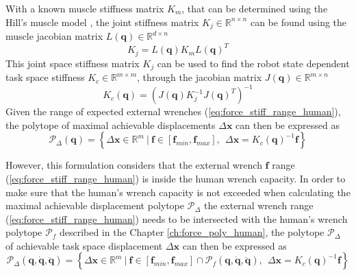 With a known muscle stiffness matrix $K_m$, that can be determined using the Hill's muscle model \cite{LATASH1993653}, the joint stiffness matrix $K_j\in \mathbb{R}^{n\times n}$ can be found using the muscle jacobian matrix $L(\bm{q}) \in \mathbb{R}^{d\times n}$
\begin{equation}
    K_j = L(\bm{q}) K_m L(\bm{q})^T 
\end{equation}
This joint space stiffness matrix $K_j$ can be used to find the robot state dependent task space stiffness $K_c  \in \mathbb{R}^{m\times m}$, through the jacobian matrix $J(\bm{q})\in\mathbb{R}^{m\times n}$  \cite{Salisbury1980,Ajoudani2018,Inouye2016}
\begin{equation}
     K_c(\bm{q}) = (J(\bm{q}) K_j^{-1}J(\bm{q})^T)^{-1}
\end{equation}
Given the range of expected external wrenches (\ref{eq:force_stiff_range_human}), the polytope of maximal achievable displacements $\Delta\bm{x}$ can then be expressed as
\begin{equation}
    \mathcal{P}_\Delta(\bm{q}) = \left\{ \Delta\bm{x} \in \mathbb{R}^m ~|~ \bm{f}\in\left[\bm{f}_{min}, \bm{f}_{max} \right], ~~ \Delta\bm{x} = K_c(\bm{q})^{-1}\bm{f} \right\}
    \label{eq:stiffness_human_simple}
\end{equation}


However, this formulation considers that the external wrench $\bm{f}$ range (\ref{eq:force_stiff_range_human}) is inside the human wrench capacity. In order to make sure that the human's wrench capacity is not exceeded when calculating the maximal achievable displacement polytope $\mathcal{P}_\Delta$ the external wrench range (\ref{eq:force_stiff_range_human}) needs to be intersected with the human's wrench polytope  $\mathcal{P}_f$ described in the Chapter \ref{ch:force_poly_human}, the polytope $\mathcal{P}_\Delta$ of achievable task space displacement $\Delta \bm{x}$ can then be expressed as
\begin{equation}
    \mathcal{P}_\Delta(\bm{q},\dot{\bm{q}},\ddot{\bm{q}}) = \left\{ \Delta\bm{x} \in \mathbb{R}^m ~|~ \bm{f}\in \left[\bm{f}_{min}, \bm{f}_{max} \right] \cap \mathcal{P}_f(\bm{q},\dot{\bm{q}},\ddot{\bm{q}}),  ~~ \! \Delta\bm{x}=K_c(\bm{q})^{-1}\bm{f}\right\}
\end{equation}

